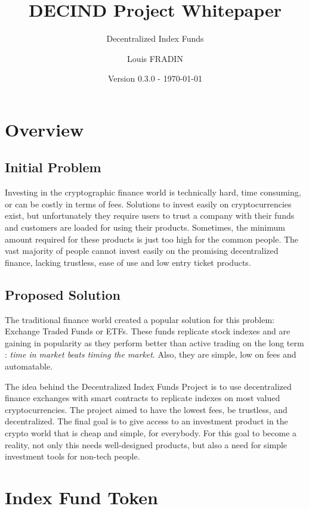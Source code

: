 \documentclass[11pt]{scrartcl}
\title{DECIND Project Whitepaper}
\subtitle{Decentralized Index Funds}
\date{Version 0.3.0 - \today}
\author{Louis FRADIN}
\begin{document}
    \maketitle
    \section{Overview}

    \subsection{Initial Problem}
    Investing in the cryptographic finance world is technically hard, time consuming,
    or can be costly in terms of fees. Solutions to invest easily on 
    cryptocurrencies exist, but unfortunately they require users to trust a company with
    their funds and customers are loaded for using their products. Sometimes, the 
    minimum amount required for these products is just too high for the common
    people. The vast majority of people cannot invest easily on the promising
    decentralized finance, lacking trustless, ease of use and low entry ticket
    products.

    \subsection{Proposed Solution}
    The traditional finance world created a popular solution for this problem:
    Exchange Traded Funds or ETFs. These funds replicate stock indexes and are
    gaining in popularity as they perform better than active trading on the long 
    term : \textit{time in market beats timing the market}. Also, they are simple,
    low on fees and automatable.

    The idea behind the Decentralized Index Funds Project is to use decentralized finance exchanges
    with smart contracts to replicate indexes on most valued cryptocurrencies.
    The project aimed to have the lowest fees, be trustless, and
   decentralized. The final goal is to give access to an investment product 
    in the crypto world that is cheap and simple, for everybody. For this goal 
    to become a reality, not only this needs well-designed products, but 
    also a need for simple investment tools for non-tech people.

    \section{Index Fund Token}
\end{document}
